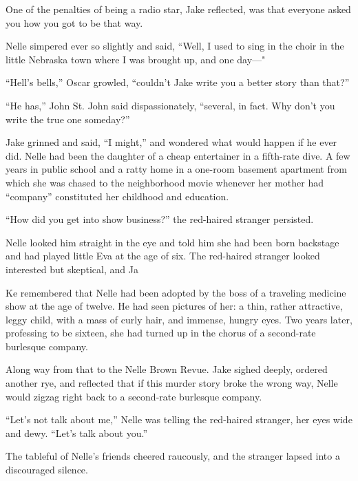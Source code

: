 \documentclass{novel}
\begin{document}
\begin{ChapterStart}
\vspace{3\nbs}
\end{ChapterStart}

One of the penalties of being a radio star, Jake reflected, was that everyone asked you how you got to be that way.

Nelle simpered ever so slightly and said, “Well, I used to sing in the choir in the little Nebraska town where I was brought up, and one day—"

“Hell’s bells,” Oscar growled, “couldn’t Jake write you a better story than that?”

“He has,” John St. John said dispassionately, “several, in fact. Why don’t you write the true one someday?”

Jake grinned and said, “I might,” and wondered what would happen if he ever did. Nelle had been the daughter of a cheap entertainer in a fifth-rate dive. A few years in public school and a ratty home in a one-room basement apartment from which she was chased to the neighborhood movie whenever her mother had “company” constituted her childhood and education.

“How did you get into show business?” the red-haired stranger persisted.

Nelle looked him straight in the eye and told him she had been born backstage and had played little Eva at the age of six. The red-haired stranger looked interested but skeptical, and Ja

Ke remembered that Nelle had been adopted by the boss of a traveling medicine show at the age of twelve. He had seen pictures of her: a thin, rather attractive, leggy child, with a mass of curly hair, and immense, hungry eyes. Two years later, professing to be sixteen, she had turned up in the chorus of a second-rate burlesque company.

Along way from that to the Nelle Brown Revue. Jake sighed deeply, ordered another rye, and reflected that if this murder story broke the wrong way, Nelle would zigzag right back to a second-rate burlesque company.

“Let’s not talk about me,” Nelle was telling the red-haired stranger, her eyes wide and dewy. “Let’s talk about you.”

The tableful of Nelle’s friends cheered raucously, and the stranger lapsed into a discouraged silence.
\end{document}
